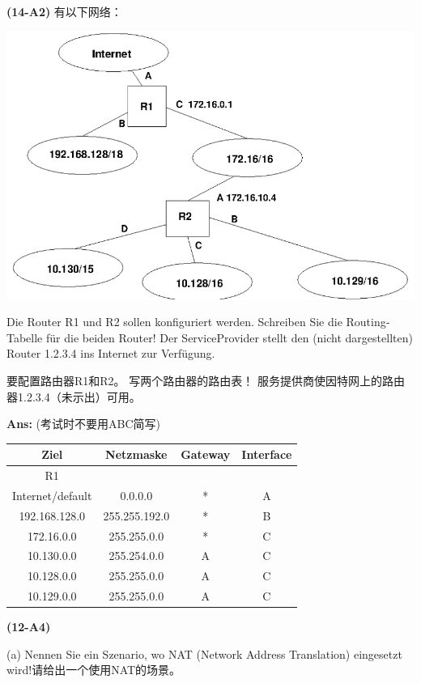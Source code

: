 \documentclass[fleqn]{article}
\begin{document}
\noindent\textbf{(14-A2)} 有以下网络：

\begin{center}
    \includegraphics[scale=0.5]{bild3.png}
\end{center}

Die Router R1 und R2 sollen konfiguriert werden. Schreiben Sie die Routing­Tabelle für die beiden Router! Der Service­Provider stellt den (nicht dargestellten) Router 1.2.3.4 ins Internet zur Verfügung.

要配置路由器R1和R2。 写两个路由器的路由表！ 服务提供商使因特网上的路由器1.2.3.4（未示出）可用。

\textbf{Ans:} (考试时不要用ABC简写)
\begin{center}
\begin{tabular}{|c|c|c|c|}
    \hline
    Ziel&Netzmaske&Gateway&Interface\\
    \hline
    R1\\
    \hline
    Internet/default&0.0.0.0&*&A\\
    \hline
    192.168.128.0&255.255.192.0&*&B\\
    \hline
    172.16.0.0&255.255.0.0&*&C\\
    \hline
    10.130.0.0&255.254.0.0&A&C\\
    \hline
    10.128.0.0&255.255.0.0&A&C\\
    \hline
    10.129.0.0&255.255.0.0&A&C\\
    \hline
\end{tabular}
\end{center}

\noindent\textbf{(12-A4)} 

(a) Nennen Sie ein Szenario, wo NAT (Network Address Translation) eingesetzt wird!请给出一个使用NAT的场景。
\end{document}
